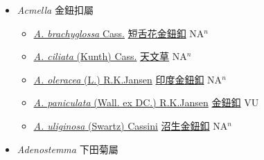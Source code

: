 
  \begin{itemize}
 \item[] \textit{Acmella} 金鈕扣屬
                    
  \begin{itemize}
        \item[] \href{http://www.theplantlist.org/tpl1.1/search?q=Acmella+brachyglossa}{\textit{A. brachyglossa} Cass.}   \href{\detokenize{http://taibnet.sinica.edu.tw/chi/taibnet_species_list.php?T2=短舌花金鈕釦&T2_new_value=true&fr=y}}{短舌花金鈕釦} NA$^n$
        \item[] \href{http://www.theplantlist.org/tpl1.1/search?q=Acmella+ciliata}{\textit{A. ciliata} (Kunth) Cass.}   \href{\detokenize{http://taibnet.sinica.edu.tw/chi/taibnet_species_list.php?T2=天文草&T2_new_value=true&fr=y}}{天文草} NA$^n$
        \item[] \href{http://www.theplantlist.org/tpl1.1/search?q=Acmella+oleracea}{\textit{A. oleracea} (L.) R.K.Jansen}   \href{\detokenize{http://taibnet.sinica.edu.tw/chi/taibnet_species_list.php?T2=印度金鈕釦&T2_new_value=true&fr=y}}{印度金鈕釦} NA$^n$
        \item[] \href{http://www.theplantlist.org/tpl1.1/search?q=Acmella+paniculata}{\textit{A. paniculata} (Wall. ex DC.) R.K.Jansen}   \href{\detokenize{http://taibnet.sinica.edu.tw/chi/taibnet_species_list.php?T2=金鈕釦&T2_new_value=true&fr=y}}{金鈕釦} VU
        \item[] \href{http://www.theplantlist.org/tpl1.1/search?q=Acmella+uliginosa}{\textit{A. uliginosa} (Swartz) Cassini}   \href{\detokenize{http://taibnet.sinica.edu.tw/chi/taibnet_species_list.php?T2=沼生金鈕釦&T2_new_value=true&fr=y}}{沼生金鈕釦} NA$^n$
  \end{itemize}
 \item[] \textit{Adenostemma} 下田菊屬
                    

\end{itemize}
